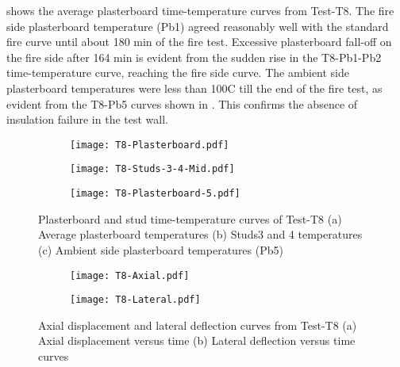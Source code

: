  shows the average plasterboard time-temperature curves from Test-T8. The fire side plasterboard temperature (Pb1) agreed reasonably well with the standard fire curve until about 180 min of the fire test. Excessive plasterboard fall-off on the fire side after 164 min is evident from the sudden rise in the T8-Pb1-Pb2 time-temperature curve, reaching the fire side curve. The ambient side plasterboard temperatures were less than 100\degree C till the end of the fire test, as evident from the T8-Pb5 curves shown in . This confirms the absence of insulation failure in the test wall.
\begin{figure}[!htbp]
	\centering
	\begin{subfigure}[b]{0.7\textwidth}
		\centering
		\texttt{[image: T8-Plasterboard.pdf]}
		\caption{}
		\label{subfig:T8-Plasterboard}
	\end{subfigure}
	\begin{subfigure}[b]{0.7\textwidth}
		\centering
		\texttt{[image: T8-Studs-3-4-Mid.pdf]}
		\caption{}
		\label{subfig:T8-Studs-3-4-Mid}
	\end{subfigure}
	\label{fig:T8-time-temperature-a}
\end{figure}
\begin{figure}[!htbp]
	\ContinuedFloat
	\centering
	\begin{subfigure}[b]{0.7\textwidth}
		\centering
		\texttt{[image: T8-Plasterboard-5.pdf]}
		\caption{}
		\label{subfig:T8-Plasterboard-5}
	\end{subfigure}
	\caption{Plasterboard and stud time-temperature curves of Test-T8 (a) Average plasterboard temperatures (b) Studs3 and 4 temperatures (c) Ambient side plasterboard temperatures (Pb5) }
	\label{fig:T8-time-temperature-b}
\end{figure}
\begin{figure}[!htbp]
	\centering
	\begin{subfigure}[b]{0.7\textwidth}
		\centering
		\texttt{[image: T8-Axial.pdf]}
		\caption{}
		\label{subfig:T8-Axial}
	\end{subfigure}
	\begin{subfigure}[b]{0.7\textwidth}
		\centering
		\texttt{[image: T8-Lateral.pdf]}
		\caption{}
		\label{subfig:T8-Lateral}
	\end{subfigure}
	\caption{Axial displacement and lateral deflection curves from Test-T8 (a) Axial displacement versus time (b) Lateral deflection versus time curves}
	\label{fig:T8-displacement}
\end{figure}

